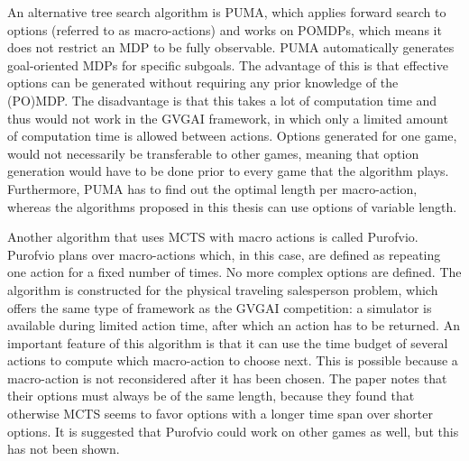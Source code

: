 An alternative tree search algorithm is PUMA, which applies forward search to
options (referred to as macro-actions) and works on POMDPs, which means it does
not restrict an MDP to be fully observable.  PUMA automatically generates
goal-oriented MDPs for specific subgoals. The advantage of this is that
effective options can be generated without requiring any prior knowledge of the
(PO)MDP. The disadvantage is that this takes a lot of computation time and thus
would not work in the GVGAI framework, in which only a limited amount of
computation time is allowed between actions. Options generated for one game,
would not necessarily be transferable to other games, meaning that option
generation would have to be done prior to every game that the algorithm plays.
Furthermore, PUMA has to find out the optimal length per macro-action, whereas
the algorithms proposed in this thesis can use options of variable length.

Another algorithm that uses MCTS with macro actions is called Purofvio.
Purofvio plans over macro-actions which, in this case, are defined as repeating
one action for a fixed number of times. No more complex options are defined.
The algorithm is constructed for the physical traveling salesperson problem,
which offers the same type of framework as the GVGAI competition: a simulator is
available during limited action time, after which an action has to be returned.
An important feature of this algorithm is that it can use the time budget of
several actions to compute which macro-action to choose next.  This is possible
because a macro-action is not reconsidered after it has been chosen. The paper
notes that their options must always be of the same length, because they found
that otherwise MCTS seems to favor options with a longer time span over shorter
options. It is suggested that Purofvio could work on other games as well, but
this has not been shown.
